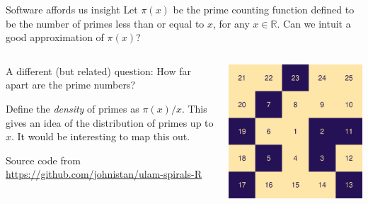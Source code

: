 \documentclass[,aspectratio=169]{beamer}
\newcommand{\bbR}{\mathbb{R}}
\begin{document}
\begin{frame}{Software affords us insight}
\protect\hypertarget{software-affords-us-insight}{}
Let \(\pi(x)\) be the prime counting function defined to be the number
of primes less than or equal to \(x\), for any \(x\in\bbR\). Can we
intuit a good approximation of \(\pi(x)\)?

\vspace{1em}

\begin{columns}[T]
\begin{column}{0.48\textwidth}
\vspace{1em}

A different (but related) question: How far apart are the prime numbers?

\vspace{1em}

Define the \emph{density} of primes as \(\pi(x)/x\). This gives an idea
of the distribution of primes up to \(x\). It would be interesting to
map this out.

\vspace{1em}

\footnotesize

Source code from \url{https://github.com/johnistan/ulam-spirals-R}
\end{column}

\begin{column}{0.48\textwidth}
\vspace{-1em}

\begin{center}\includegraphics[width=0.8\linewidth]{figure/unnamed-chunk-2-1} \end{center}
\end{column}
\end{columns}
\end{frame}
\end{document}
